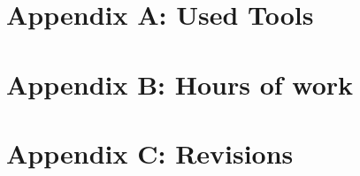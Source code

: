 \documentclass[openright]{report}
\newcommand\blankpage{%
    \null
    \thispagestyle{empty}%
    \addtocounter{page}{-1}%
    \newpage}
\begin{document}

    \clearpage
	\setcounter{page}{1}

	\blankpage

    \appendix
    \newpage
    \chapter{Appendix A: Used Tools}
	    

	\newpage
	\chapter{Appendix B: Hours of work}
	    

	\newpage
	\chapter{Appendix C: Revisions}
	    

	
	\glsaddall
	\printglossaries

	\newpage
	\begin{thebibliography}{10}
		
	\end{thebibliography}
\end{document}
